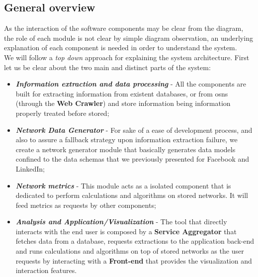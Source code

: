 \subsection{General overview}
As the interaction of the software components may be clear from the diagram, the role of each module is not clear by simple
diagram observation, an underlying explanation of each component is needed in order to understand the system.\\
\indent We will follow a \textit{top down} approach for explaining the system architecture. First let us be clear about the two
main and distinct parts of the system:
\begin{itemize}
    \item \textbf{\textit{Information extraction and data processing}} - All the components are built for extracting information
    from existent databases, or from \glspl{osn} (through the \textbf{Web Crawler}) and store information being information properly treated before stored;
    \item \textbf{\textit{Network Data Generator}} - For sake of a ease of development process, and also to assure a fallback strategy upon information extraction failure, we create a network generator module that basically generates data models confined to the data schemas that we previously presented for Facebook and LinkedIn;
    \item \textbf{\textit{Network metrics}} - This module acts as a isolated component that is dedicated to perform calculations and algorithms on stored networks. It will feed metrics as requests by other components;
    \item \textbf{\textit{Analysis and Application/Visualization}} - The tool that directly interacts with the end user is composed by a \textbf{Service Aggregator} that fetches data from a database, requests extractions to the application back-end and runs calculations and algorithms on top of stored networks as the user requests by interacting with a \textbf{Front-end} that provides the visualization and interaction features.
\end{itemize}


